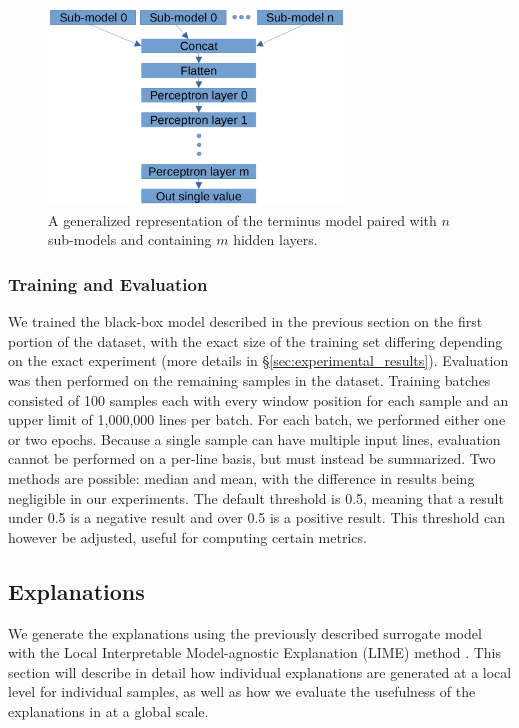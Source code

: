 \documentclass{article}
\begin{document}
			\begin{figure}[htbp]
				\begin{center}
					\includegraphics[width=0.7\textwidth]{images/term_model.png}
					\caption{A generalized representation of the terminus model paired with \(n\)
					sub-models and containing \(m\) hidden layers.}
					\label{fig:term_model}
				\end{center}
			\end{figure}
			\subsubsection{Training and Evaluation}
			We trained the black-box model described in the previous section on the first portion
			of the dataset, with the exact size of the training set differing depending on the
			exact experiment (more details in §\ref{sec:experimental_results}). Evaluation was
			then performed on the remaining samples in the dataset. Training batches consisted of
			100 samples each with every window position for each sample and an upper limit of
			1,000,000 lines per batch. For each batch, we performed either one or two epochs.
			Because a single sample can have multiple input lines, evaluation cannot be performed
			on a per-line basis, but must instead be summarized. Two methods are possible: median
			and mean, with the difference in results being negligible in our experiments. The
			default threshold is 0.5, meaning that a result under 0.5 is a negative result and
			over 0.5 is a positive result. This threshold can however be adjusted, useful for
			computing certain metrics.
		\subsection{Explanations}
		\label{sec:method_exp}
		We generate the explanations using the previously described surrogate model with the Local
		Interpretable Model-agnostic Explanation (LIME) method \cite{ribeiro_why_2016}. This
		section will describe in detail how individual explanations are generated at a local level
		for individual samples, as well as how we evaluate the usefulness of the explanations in
		at a global scale.
\end{document}
